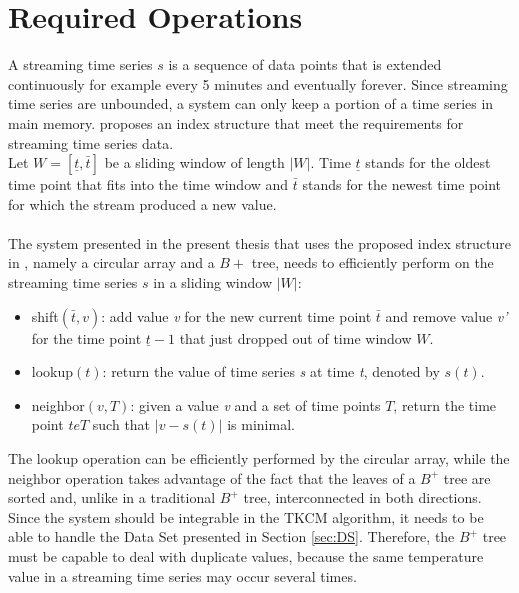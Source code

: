 \documentclass[abstracton,12pt]{scrreprt}
\begin{document}
\section{Required Operations}
\label{sec:Op}
A streaming time series $s$ is a sequence of data points that is extended continuously for example every 5 minutes and eventually forever. Since streaming time series are unbounded, a system can only keep a portion of a time series in main memory. \cite{BScT} proposes an index structure that meet the requirements for streaming time series data.\\
Let $W=[ \underline{t}, \bar{t} ]$ be a sliding window of length $|W|$. Time $\underline{t}$ stands for the oldest time point that fits into the time window and $\bar{t}$ stands for the newest time point for which the stream produced a new value. \\\\
The system presented in the present thesis that uses the proposed index structure in \cite{BScT}, namely a circular array and a $B+$ tree, needs to efficiently perform on the streaming time series $s$ in a sliding window $|W|$: \\
\begin{itemize}  
	\item shift$(\bar{t}, v)$: add value \emph{v} for the new current time point $\bar{t}$ and remove value \emph{v'} for the time point $\underline{t} - 1$ that just dropped out of time window $W$.
	\item lookup$(t)$: return the value of time series \emph{s} at time \emph{t}, denoted by $s(t)$.
	\item neighbor$(v, T)$: given a value \emph{v} and a set of time points $T$, return the time point $t e T$ such that $|v-s(t)|$ is minimal.\\
\end{itemize}
The lookup operation can be efficiently performed by the circular array, while the neighbor operation takes advantage of the fact that the leaves of a $B^+$ tree are sorted and, unlike in a traditional $B^+$ tree, interconnected in both directions. \\
Since the system should be integrable in the TKCM algorithm, it needs to be able to handle the Data Set presented in Section \ref{sec:DS}. Therefore, the $B^+$ tree must be capable to deal with duplicate values, because the same temperature value in a streaming time series may occur several times. 
\end{document}
